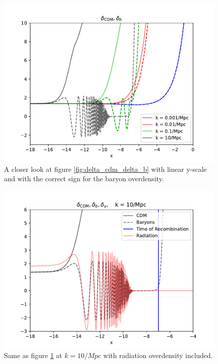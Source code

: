 \documentclass{aa}
\begin{document}
\begin{figure}[H]
   \includegraphics[scale=0.65]{../figures/milestone3/delta_cdm_delta_b_zoom.pdf}
   \caption{A closer look at figure \ref{fig:delta_cdm_delta_b} with linear y-scale and with the correct sign for the baryon overdensity.}\label{fig:delta_cdm_delta_b_zoom}
\end{figure}

\begin{figure}[H]
   \includegraphics[scale=0.65]{../figures/milestone3/delta_cdm_delta_b_delta_gamma.pdf}
   \caption{Same as figure \ref{fig:delta_cdm_delta_b_zoom} at $k=10/Mpc$ with radiation overdensity included.}\label{fig:delta_cdm_delta_b_delta_gamma}
\end{figure}
\end{document}
